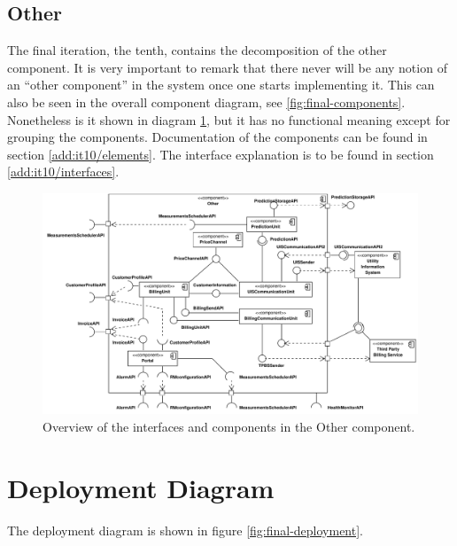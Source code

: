 \subsection{Other}

\npar The final iteration, the tenth, contains the decomposition of the other
component. It is very important to remark that there never will be any notion of
an ``other component'' in the system once one starts implementing it. This can
also be seen in the overall component diagram, see \ref{fig:final-components}.
Nonetheless is it shown in diagram \ref{fig:final-architecture/it10}, but it has
no functional meaning except for grouping the components. Documentation of the
components can be found in section \ref{add:it10/elements}. The interface
explanation is to be found in section \ref{add:it10/interfaces}.

\begin{figure}[H]
	\begin{centering}
		\includegraphics[width=\textwidth]{figs/add-it10-interfaces.pdf}
		\caption{Overview of the interfaces and components in the Other component.}
		\label{fig:final-architecture/it10}
	\end{centering}
\end{figure}

\section{Deployment Diagram}

\npar The deployment diagram is shown in figure \ref{fig:final-deployment}. 

